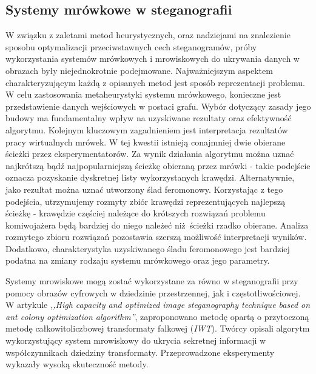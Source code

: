 {{        \subsection{Systemy mrówkowe w steganografii}
        {
            W związku z zaletami metod heurystycznych, oraz nadziejami na znalezienie sposobu optymalizacji
            przeciwstawnych cech steganogramów, próby wykorzystania systemów mrówkowych i mrowiskowych do ukrywania
            danych w obrazach były niejednokrotnie podejmowane\cite{Priya2018HIGHCA, ZghaerACOStegEN, Khan2018AntCO}.
            Najważniejszym aspektem charakteryzującym każdą z opisanych metod jest sposób reprezentacji problemu. W celu
            zastosowania metaheurystyki systemu mrówkowego, konieczne jest przedstawienie danych wejściowych w postaci
            grafu. Wybór dotyczący zasady jego budowy ma fundamentalny wpływ na uzyskiwane rezultaty oraz efektywność
            algorytmu. Kolejnym kluczowym zagadnieniem jest interpretacja rezultatów pracy wirtualnych mrówek. W tej
            kwestii istnieją conajmniej dwie obierane ścieżki przez eksperymentatorów. Za wynik działania algorytmu
            można uznać najkrótszą bądź najpopularniejszą ścieżkę obieraną przez mrówki - takie podejście oznacza
            pozyskanie dyskretnej listy wykorzystanych krawędzi. Alternatywnie, jako rezultat można uznać utworzony ślad
            feromonowy. Korzystając z tego podejścia, utrzymujemy rozmyty zbiór krawędzi reprezentujących najlepszą
            ścieżkę - krawędzie częściej należące do krótszych rozwiązań problemu komiwojażera będą bardziej do niego
            należeć niż ścieżki rzadko obierane. Analiza rozmytego zbioru rozwiązań pozostawia szerszą możliwość
            interpretacji wyników. Dodatkowo, charakterystyka uzyskiwanego śladu feromonowego jest bardziej podatna na
            zmiany rodzaju systemu mrówkowego oraz jego parametry.

            Systemy mrowiskowe mogą zostać wykorzystane za równo w steganografii przy pomocy obrazów cyfrowych w
            dziedzinie przestrzennej\cite{ZghaerACOStegEN, Khan2018AntCO}, jak i
            częstotliwościowej\cite{Priya2018HIGHCA}. W artykule \textit{,,High capacity and optimized image
            steganography technique based on ant colony optimization algorithm''}, zaproponowano metodę opartą o
            przytoczoną metodę całkowitoliczbowej transformaty falkowej (\textit{IWT}). Twórcy opisali algorytm
            wykorzystujący system mrowiskowy do ukrycia sekretnej informacji w współczynnikach dziedziny transformaty.
            Przeprowadzone eksperymenty wykazały wysoką skuteczność metody\cite{Priya2018HIGHCA}.

}}}
